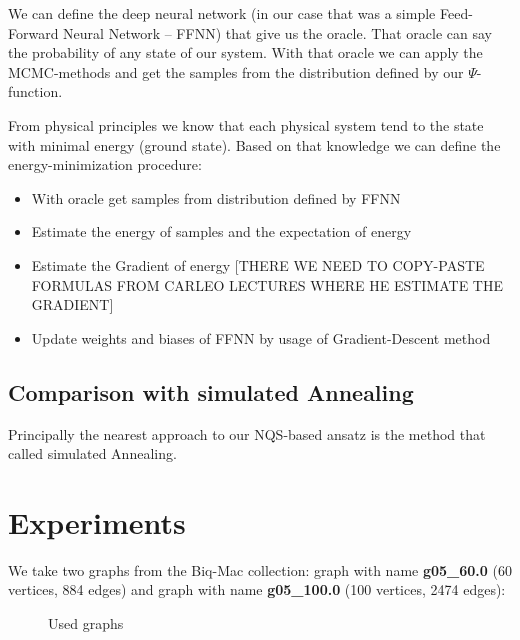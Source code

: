 \documentclass{article}
\begin{document}
We can define the deep neural network (in our case that was a simple Feed-Forward Neural Network -- FFNN) that give us the oracle. That oracle can say the probability of any state of our system. With that oracle we can apply the MCMC-methods\cite{MCMC} and get the samples from the distribution defined by our $\Psi$-function.

From physical principles we know that each physical system tend to the state with minimal energy (ground state). Based on that knowledge we can define the energy-minimization procedure:
\begin{itemize}
\item With oracle get samples from distribution defined by FFNN
\item Estimate the energy of samples and the expectation of energy
\item Estimate the Gradient of energy [THERE WE NEED TO COPY-PASTE FORMULAS FROM CARLEO LECTURES WHERE HE ESTIMATE THE GRADIENT]
\item Update weights and biases of FFNN by usage of Gradient-Descent method
\end{itemize}

\subsection{Comparison with simulated Annealing}
Principally the nearest approach to our NQS-based ansatz is the method that called simulated Annealing. 



\section{Experiments}
We take two graphs from the Biq-Mac collection\cite{BiqMac}: graph with name \textbf{g05\_60.0} (60 vertices, 884 edges) and graph with name \textbf{g05\_100.0} (100 vertices, 2474 edges):


\begin{figure}
\centering
{}
\qquad
{}
\caption{Used graphs}
\end{figure}
\end{document}
